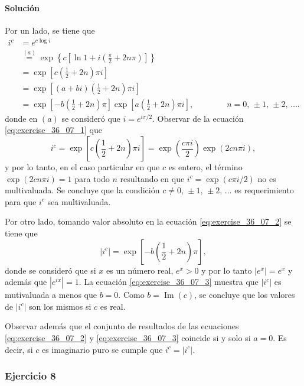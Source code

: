 \documentclass[a4paper]{report}
\renewcommand{\Im}{\operatorname{Im}}
\begin{document}
\paragraph{Solución} Por un lado, se tiene que 
\begin{align}
 i^c&=e^{c\log i}\nonumber\\
  &\overset{(a)}{=}\exp\left\{c\left[\ln1+i\left(\frac{\pi}{2}+2n\pi\right)\right]\right\}\nonumber\\
  &=\exp\left[c\left(\frac{1}{2}+2n\right)\pi i\right]\label{eq:exercise_36_07_1}\\
  &=\exp\left[(a+bi)\left(\frac{1}{2}+2n\right)\pi i\right]\nonumber\\
  &=\exp\left[-b\left(\frac{1}{2}+2n\right)\pi\right]\exp\left[a\left(\frac{1}{2}+2n\right)\pi i\right],\qquad\qquad n=0,\,\pm1,\,\pm2,\,\dots.\label{eq:exercise_36_07_2}
\end{align}
donde en \((a)\) se consideró que \(i=e^{i\pi/2}\). Observar de la ecuación \ref{eq:exercise_36_07_1} que 
\[
 i^c=\exp\left[c\left(\frac{1}{2}+2n\right)\pi i\right]=\exp\left(\frac{c\pi i}{2}\right)\exp\left(2cn\pi i\right),
\]
y por lo tanto, en el caso particular en que \(c\) es entero, el término \(\exp\left(2cn\pi i\right)=1\) para todo \(n\) resultando en que \(i^c=\exp(c\pi i/2)\) no es multivaluada. Se concluye que la condición \(c\neq0,\,\pm1,\,\pm2,\,\dots\) es requerimiento para que \(i^c\) sea multivaluada.

Por otro lado, tomando valor absoluto en la ecuación \ref{eq:exercise_36_07_2} se tiene que
\begin{equation}\label{eq:exercise_36_07_3}
 |i^c|=\exp\left[-b\left(\frac{1}{2}+2n\right)\pi\right], 
\end{equation}
donde se consideró que si \(x\) es un número real, \(e^x>0\) y por lo tanto \(|e^x|=e^x\) y además que \(|e^{ix}|=1\). La ecuación \ref{eq:exercise_36_07_3} muestra que \(|i^c|\) es mutivaluada a menos que \(b=0\). Como \(b=\Im(c)\), se concluye que los valores de \(|i^c|\) son  los mismos si \(c\) es real.

Observar además que el conjunto de resultados de las ecuaciones \ref{eq:exercise_36_07_2} y \ref{eq:exercise_36_07_3} coincide si y solo si \(a=0\). Es decir, si \(c\) es imaginario puro se cumple que \(i^c=|i^c|\).

\subsubsection{Ejercicio 8}
\end{document}
